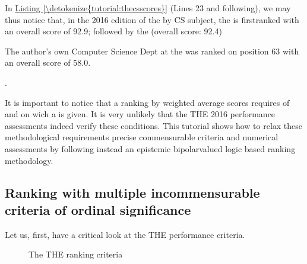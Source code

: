 \documentclass[a4paper,12pt,english]{sphinxhowto}
\begin{document}
In \hyperref[\detokenize{tutorial:thecsscores}]{Listing \ref{\detokenize{tutorial:thecsscores}}} (Lines 23 and following), we may thus notice that, in the 2016 edition of the  by CS subject, the  is first\sphinxhyphen{}ranked with an overall score of 92.9; followed by the  (overall score: 92.4) %
\begin{footnote}[38]\sphinxAtStartFootnote
The author’s own Computer Science Dept at the  was ranked on position 63 with an overall score of 58.0.
%
\end{footnote}.

It is important to notice that a ranking by weighted average scores requires  of  and on wich a  is given. It is very unlikely that the THE 2016 performance assessments indeed verify these conditions. This tutorial shows how to relax these methodological requirements \sphinxhyphen{}precise commensurable criteria and numerical assessments\sphinxhyphen{} by following instead an epistemic bipolar\sphinxhyphen{}valued logic based ranking methodology.


\subsection{Ranking with multiple incommensurable criteria of ordinal significance}
\label{\detokenize{tutorial:ranking-with-multiple-incommensurable-criteria-of-ordinal-significance}}
Let us, first, have a critical look at the THE performance criteria.

\begin{sphinxVerbatim}[commandchars=\\\{\}]
\end{sphinxVerbatim}

\begin{figure}[H]
\centering
\capstart

\noindent{}
\caption{The THE ranking criteria}\label{\detokenize{tutorial:thecscriteria}}\end{figure}
\end{document}
